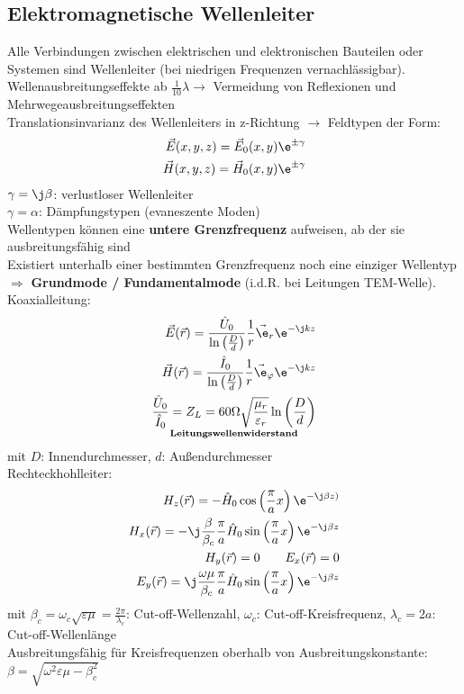 \documentclass[german, fourcolumn, 6pt]{latex4ei/latex4ei_sheet}
\begin{document}
    \subsection{Elektromagnetische Wellenleiter}
    Alle Verbindungen zwischen elektrischen und elektronischen Bauteilen oder Systemen sind Wellenleiter (bei niedrigen Frequenzen vernachlässigbar).\\
    Wellenausbreitungseffekte ab $\frac{1}{10}\lambda \rightarrow$ Vermeidung von Reflexionen und Mehrwegeausbreitungseffekten\\
    Translationsinvarianz des Wellenleiters in z-Richtung $\rightarrow$ Feldtypen der Form:
    \begin{align*}
        \vec E(x,y,z) = \vec E_0(x,y)\e^{\pm\gamma} \\
        \vec H(x,y,z) = \vec H_0(x,y)\e^{\pm\gamma}
    \end{align*}
$\gamma = \j\beta$: verlustloser Wellenleiter\\
$\gamma = \alpha$: Dämpfungstypen (evaneszente Moden)\\
    Wellentypen können eine \textbf{untere Grenzfrequenz} aufweisen, ab der sie ausbreitungsfähig sind\\
    Existiert unterhalb einer bestimmten Grenzfrequenz noch eine einziger Wellentyp $\Rightarrow$ \textbf{Grundmode / Fundamentalmode} (i.d.R. bei Leitungen TEM-Welle).\\
    Koaxialleitung:
    \begin{align*}
        \vec E(\vec r) = \frac{\hat U_0}{\ln\left(\frac{D}{d}\right)}\frac{1}{r}\vec\e_r\e^{-\j kz}       \\
        \vec H(\vec r) = \frac{\hat I_0}{\ln\left(\frac{D}{d}\right)}\frac{1}{r}\vec\e_\varphi\e^{-\j kz} \\
        \underset{\textbf{Leitungswellenwiderstand}}{\frac{\hat U_0}{\hat I_0} = Z_L = 60\Omega\sqrt{\frac{\mu_r}{\varepsilon_r}}\ln\left(\frac{D}{d}\right)}
    \end{align*}
    mit $D$: Innendurchmesser, $d$: Außendurchmesser\\

    Rechteckhohlleiter:
    \begin{align*}
        H_z(\vec r) = -\hat H_0\cos\left(\frac{\pi}{a}x\right)\e^{-\j\beta z)}                                     \\
        H_x(\vec r) = -\j \frac{\beta}{\beta_c}\frac{\pi}{a}\hat H_0\sin\left(\frac{\pi}{a}x\right)\e^{-\j\beta z} \\
        H_y(\vec r) = 0\qquad E_x(\vec r) = 0                                                                      \\
        E_y(\vec r) = \j \frac{\omega\mu}{\beta_c}\frac{\pi}{a}\hat H_0\sin\left(\frac{\pi}{a}x\right)\e^{-\j\beta z}
    \end{align*}
    mit $\beta_c = \omega_c\sqrt{\varepsilon\mu} = \frac{2\pi}{\lambda_c}$: Cut-off-Wellenzahl, $\omega_c$: Cut-off-Kreisfrequenz, $\lambda_c = 2a$: Cut-off-Wellenlänge\\
    Ausbreitungsfähig für Kreisfrequenzen oberhalb von Ausbreitungskonstante: $\beta = \sqrt{\omega^2\varepsilon\mu-\beta_c^2}$
\end{document}
